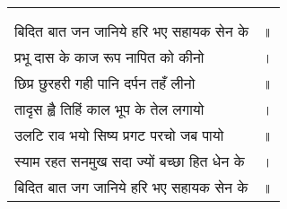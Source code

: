 {
{\bfseries
\setlength{\mylenone}{0pt}
\settowidth{\mylentwo}{}
\setlength{\mylenone}{\maxof{\mylenone}{\mylentwo}}
\settowidth{\mylentwo}{बिदित बात जन जानिये हरि भए सहायक सेन के}
\setlength{\mylenone}{\maxof{\mylenone}{\mylentwo}}
\settowidth{\mylentwo}{प्रभू दास के काज रूप नापित को कीनो}
\setlength{\mylenone}{\maxof{\mylenone}{\mylentwo}}
\settowidth{\mylentwo}{छिप्र छुरहरी गही पानि दर्पन तहँ लीनो}
\setlength{\mylenone}{\maxof{\mylenone}{\mylentwo}}
\settowidth{\mylentwo}{तादृस ह्वै तिहिं काल भूप के तेल लगायो}
\setlength{\mylenone}{\maxof{\mylenone}{\mylentwo}}
\settowidth{\mylentwo}{उलटि राव भयो सिष्य प्रगट परचो जब पायो}
\setlength{\mylenone}{\maxof{\mylenone}{\mylentwo}}
\settowidth{\mylentwo}{स्याम रहत सनमुख सदा ज्यों बच्छा हित धेन के}
\setlength{\mylenone}{\maxof{\mylenone}{\mylentwo}}
\settowidth{\mylentwo}{बिदित बात जग जानिये हरि भए सहायक सेन के}
\setlength{\mylenone}{\maxof{\mylenone}{\mylentwo}}
\setlength{\mylentwo}{\baselineskip}
\setlength{\mylenone}{\mylenone + 1pt}
\begin{longtable}[l]{@{\hspace*{\mylen}}>{\setlength\parfillskip{0pt}}p{\mylenone}@{}@{}l@{}}
 & \\[-\the\mylentwo]
\centering{॥ ६३ \hspace*{-1.5mm}॥} & \\ \nopagebreak
बिदित बात जन जानिये हरि भए सहायक सेन के & ॥\\
प्रभू दास के काज रूप नापित को कीनो & ।\\ \nopagebreak
छिप्र छुरहरी गही पानि दर्पन तहँ लीनो & ॥\\
तादृस ह्वै तिहिं काल भूप के तेल लगायो & ।\\ \nopagebreak
उलटि राव भयो सिष्य प्रगट परचो जब पायो & ॥\\
स्याम रहत सनमुख सदा ज्यों बच्छा हित धेन के & ।\\ \nopagebreak
बिदित बात जग जानिये हरि भए सहायक सेन के & ॥
\end{longtable}
}
}
